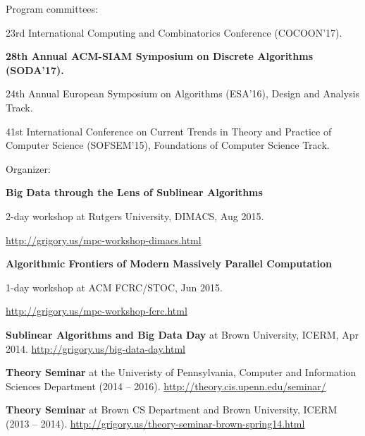 \documentclass[11pt]{article}
\newenvironment{innerlist}[1][\enskip\textbullet]%
        {\begin{compactitem}[#1]}{\end{compactitem}}
\newcommand{\blankline}{\quad\pagebreak[2]}
\begin{document}
\blankline

Program committees:
\begin{innerlist}
	\item 23rd International Computing and Combinatorics Conference (COCOON'17).
	\item \textbf{28th Annual ACM-SIAM Symposium on Discrete Algorithms (SODA'17).}
	\item 24th Annual European Symposium on Algorithms (ESA'16), Design and Analysis Track. 
	\item 41st International Conference on Current Trends in Theory and Practice of Computer Science (SOFSEM'15), Foundations of Computer Science Track.
\end{innerlist}

\blankline

Organizer:
\begin{innerlist}
	\item \textbf{Big Data through the Lens of Sublinear Algorithms} 
	
	2-day workshop at Rutgers University, DIMACS, Aug 2015. 
	
	\url{http://grigory.us/mpc-workshop-dimacs.html}
	\item \textbf{Algorithmic Frontiers of Modern Massively Parallel Computation}
	
	 1-day workshop at ACM FCRC/STOC, Jun 2015. 
	 
	 \url{http://grigory.us/mpc-workshop-fcrc.html}
	\item \textbf{Sublinear Algorithms and Big Data Day} at Brown University, ICERM, Apr 2014. \url{http://grigory.us/big-data-day.html}
	\item \textbf{Theory Seminar} at the Univeristy of Pennsylvania, Computer and Information Sciences Department (2014 -- 2016). \url{http://theory.cis.upenn.edu/seminar/}
	\item \textbf{Theory Seminar} at Brown CS Department and Brown University, ICERM (2013 -- 2014). \url{http://grigory.us/theory-seminar-brown-spring14.html}
\end{innerlist}
\end{document}
